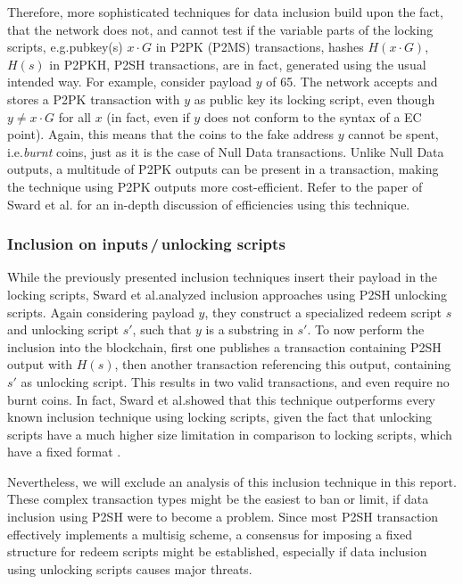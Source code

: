 \documentclass[a4paper,11pt,titlepage]{scrbook}
\begin{document}
Therefore, more sophisticated techniques for data inclusion build upon the fact, that the network does not, and cannot test if the variable parts of the locking scripts, e.g.\@ pubkey(s) $x\cdot G$ in P2PK (P2MS) transactions, hashes $H(x\cdot G)$, $H(s)$ in P2PKH, P2SH transactions, are in fact, generated using the usual intended way.
For example, consider payload $y$ of \SI{65}{\byte}.
The network accepts and stores a P2PK transaction with $y$ as  public key its locking script, even though $y\neq x\cdot G$ for all $x$ (in fact, even if $y$ does not conform to the syntax of a EC point).
Again, this means that the coins  to the fake address $y$ cannot be spent, i.e.\@ \emph{burnt} coins, just as it is the case of Null Data transactions.
Unlike Null Data outputs, a multitude of P2PK outputs can be present in a transaction, making the technique using P2PK outputs more cost-efficient.
Refer to the paper of Sward et al.\@ \cite{sward_data_2018} for an in-depth discussion of efficiencies using this technique.

\subsubsection*{Inclusion on inputs\,/\,unlocking scripts}
While the previously presented inclusion techniques insert their payload in the locking scripts, Sward et al.\@ analyzed inclusion approaches using P2SH unlocking scripts.
Again considering payload $y$, they construct a specialized redeem script $s$ and unlocking script $s'$, 
such that $y$ is a substring in $s'$.
To now perform the inclusion into the blockchain, first one publishes a transaction containing P2SH output with $H(s)$, then another transaction referencing this output, containing $s'$ as unlocking script.
This results in two valid transactions, and even require no burnt coins.
In fact, Sward et al.\@ showed that this technique outperforms every known inclusion technique using locking scripts, given the fact that unlocking scripts have a much higher size limitation in comparison to locking scripts, which have a fixed format \cite{sward_data_2018}.

Nevertheless, we will exclude an analysis of this inclusion technique in this report.
These complex transaction types might be the easiest to ban or limit, if data inclusion using P2SH were to become a problem.
Since most P2SH transaction effectively implements a multisig scheme, a consensus for imposing a fixed structure for redeem scripts might be established, especially if data inclusion using unlocking scripts causes major threats.
\end{document}
